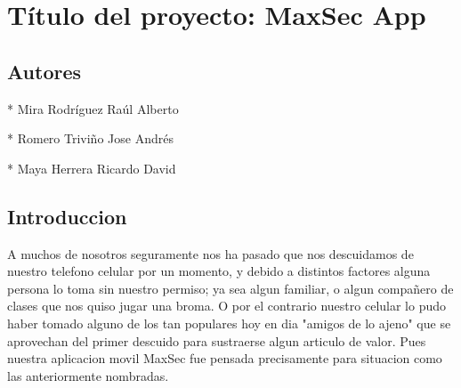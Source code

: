 \documentclass[12pt,letterpaper]{article}
\begin{document}
\section{Título del proyecto: MaxSec App}
\subsection{Autores}

* Mira Rodríguez Raúl Alberto

* Romero Triviño Jose Andrés

* Maya Herrera Ricardo David

\subsection{Introduccion}

A muchos de nosotros seguramente nos ha pasado que nos descuidamos de nuestro telefono celular por un momento, y debido a distintos factores alguna persona lo toma sin nuestro permiso; ya sea algun familiar, o algun compañero de clases que nos quiso jugar una broma. O por el contrario nuestro celular lo pudo haber tomado alguno de los tan populares hoy en dia "amigos de lo ajeno" que se aprovechan del primer descuido para sustraerse algun articulo de valor.
Pues nuestra aplicacion movil MaxSec fue pensada precisamente para situacion como las anteriormente nombradas.
\end{document}
